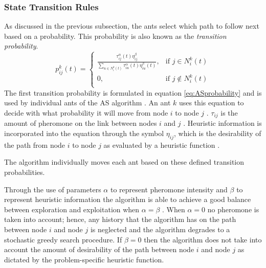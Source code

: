 \subsubsection{State Transition Rules}
 As discussed in the previous subsection, the ants select which path to follow next based on a probability. This probability is also known as the \emph{transition probability}.
\begin{equation}
\label{eq:ASprobability}
p^k_{ij}(t) =
\begin{cases}
	\frac{\tau^{\alpha}_{ij}(t)\eta^{\beta}_{ij}}{\sum_{u \in N^k_i(t)} {\tau^{\alpha}_{iu}(t)\eta^{\beta}_{iu}(t)}}, &\text{if $j \in N^k_i(t)$}\\
	0, &\text{if $j \notin N^k_i(t)$}\\
\end{cases}
\end{equation}
The first transition probability is formulated in equation \ref{eq:ASprobability} and is used by individual ants of the AS algorithm \cite{CompuIntelligenceIntro,AntSurvey,ACOLargeProblem,AntQAP,FundamentalSwarm}. An ant $k$ uses this equation to decide with what probability it will move from node $i$ to node $j$ \cite{CompuIntelligenceIntro,ACOLargeProblem,AntQAP,FundamentalSwarm}. $\tau_{ij}$ is the amount of pheromone on the link between nodes $i$ and $j$ \cite{CompuIntelligenceIntro,AntsAndStigmergy,ACOLargeProblem,AntQAP,FundamentalSwarm}. Heuristic information is incorporated into the equation through the symbol $\eta_{ij}$, which is the desirability of the path from node $i$ to node $j$ as evaluated by a heuristic function \cite{CompuIntelligenceIntro,AntsAndStigmergy,ACOLargeProblem,AntQAP,FundamentalSwarm}. 

The algorithm individually moves each ant based on these defined transition probabilities.

Through the use of parameters $\alpha$ to represent pheromone intensity and $\beta$ to represent heuristic information the algorithm is able to achieve a good balance between exploration and exploitation when $\alpha=\beta$ \cite{CompuIntelligenceIntro,ACOLargeProblem,AntQAP,FundamentalSwarm}. When $\alpha = 0$ no pheromone is taken into account; hence, any history that the algorithm has on the path between node $i$ and node $j$ is neglected and the algorithm degrades to a stochastic greedy search procedure. If $\beta = 0$ then the algorithm does not take into account the amount of desirability of the path between node $i$ and node $j$ as dictated by the problem-specific heuristic function.

